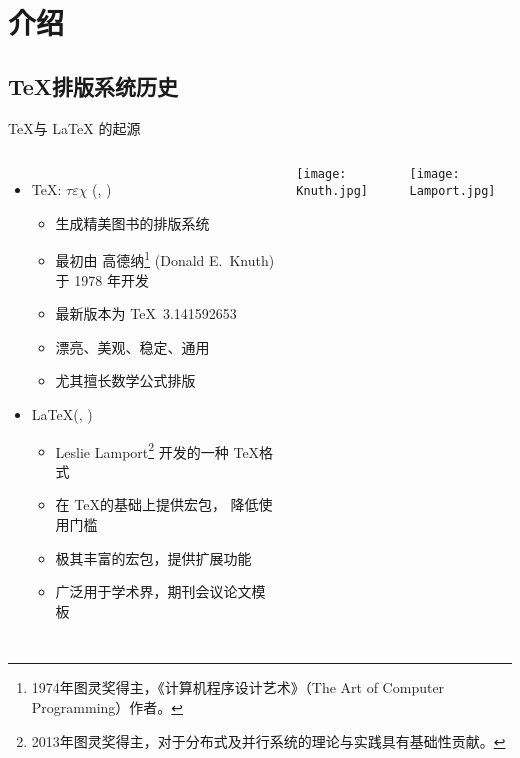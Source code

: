 \section{介绍}

\subsection{\TeX 排版系统历史}

\begin{frame}[fragile]{\TeX 与 \LaTeX{} 的起源}
  \begin{columns}[T]
    \begin{itemize}
      \item \TeX: $\tau\varepsilon\chi$ (,
        )
        \begin{itemize}
          \item 生成精美图书的排版系统
          \item 最初由 高德纳\footnote{1974年图灵奖得主，《计算机程序设计艺术》（The Art of Computer Programming）作者。} (Donald E.~Knuth) 于 1978 年开发  
          \item 最新版本为 \TeX\ 3.141592653
          \item 漂亮、美观、稳定、通用
          \item 尤其擅长数学公式排版
        \end{itemize}
        \vspace{2em}
      \item \LaTeX{}(, )
        \begin{itemize}
          \item Leslie Lamport\footnote{2013年图灵奖得主，对于分布式及并行系统的理论与实践具有基础性贡献。} 开发的一种 \TeX 格式
          \item 在 \TeX 的基础上提供宏包， 降低使用门槛
          \item 极其丰富的宏包，提供扩展功能
          \item 广泛用于学术界，期刊会议论文模板
        \end{itemize}
    \end{itemize}
    \vspace*{-5mm}
    \texttt{[image: Knuth.jpg]}

    \texttt{[image: Lamport.jpg]}

  \end{columns}
\end{frame}

